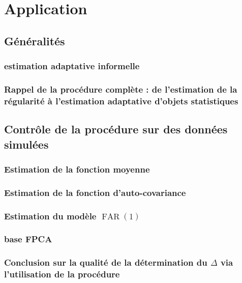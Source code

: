 \chapter{
  Application
 }
\minitoc%

\section{Généralités}

\subsection{estimation adaptative informelle}

\pagebreak

\subsection{Rappel de la procédure complète : de l'estimation de la régularité à l'estimation adaptative d'objets statistiques}

\section{Contrôle de la procédure sur des données simulées}

\subsection{Estimation de la fonction moyenne}

\subsection{Estimation de la fonction d'auto-covariance}

\subsection{Estimation du modèle $\operatorname{FAR}(1)$}

\subsection{base FPCA}

\subsection{Conclusion sur la qualité de la détermination du $\Delta$ via l'utilisation de la procédure}


